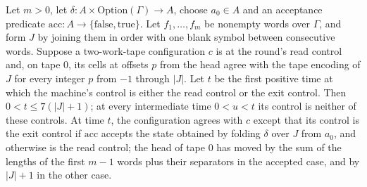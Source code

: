 \begin{theorem}
\label{Turing.rt_find_round_entry}
\leanok
{}
Let $m>0$, let $\delta:A\times\mathrm{Option}(\Gamma)\to A$, choose $a_0\in A$ and an
acceptance predicate $\mathrm{acc}:A\to\{\mathrm{false},\mathrm{true}\}$. Let
$f_1,\ldots,f_m$ be nonempty words over $\Gamma$, and form $J$ by joining them in order
with one blank symbol between consecutive words. Suppose a two-work-tape configuration
$c$ is at the round's read control and, on tape 0, its cells at offsets $p$ from the
head agree with the tape encoding of $J$ for every integer $p$ from $-1$ through $|J|$.
Let $t$ be the first positive time at which the machine's control is either the read
control or the exit control. Then $0<t\le 7(|J|+1)$; at every intermediate time $0<u<t$
its control is neither of these controls. At time $t$, the configuration agrees with $c$
except that its control is the exit control if $\mathrm{acc}$ accepts the state obtained
by folding $\delta$ over $J$ from $a_0$, and otherwise is the read control; the head of
tape 0 has moved by the sum of the lengths of the first $m-1$ words plus their
separators in the accepted case, and by $|J|+1$ in the other case.
\end{theorem}

